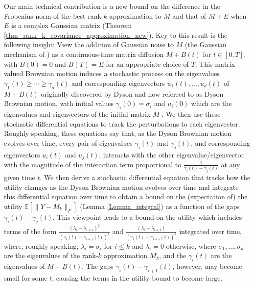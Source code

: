 \documentclass[11pt,letterpaper]{article}
\begin{document}
Our main technical contribution is a new bound on the difference in the Frobenius norm of the best rank-$k$ approximation to $M$  and that of $M+E$ when $E$ is a complex Gaussian matrix (Theorem \ref{thm_rank_k_covariance_approximation_new}). 
%
Key to this result is the following insight:  View the addition of Gaussian noise to $M$ (the Gaussian mechanism of \cite{dwork2014analyze}) as a continuous-time matrix diffusion $M + B(t)$ for $t \in [0,T]$, with $B(0)=0$ and $B(T)=E$ for an appropriate choice of $T$.
%
% 
This matrix-valued Brownian motion induces a stochastic process on the eigenvalues $\gamma_1(t) \geq \cdots \geq \gamma_d(t)$ and corresponding eigenvectors $u_1(t), \ldots, u_d(t)$ of $M+B(t)$ originally discovered by Dyson and now referred to as Dyson Brownian motion, with initial values $\gamma_i(0) = \sigma_i$ and $u_i(0)$ which are the eigenvalues and eigenvectors of the initial matrix $M$ \cite{dyson1962brownian}.
% 
We then use these stochastic differential equations to track the perturbations to each eigenvector.
%
Roughly speaking, these equations say that, as the Dyson Brownian motion evolves over time, every pair of eigenvalues $\gamma_i(t)$ and $\gamma_j(t)$, and corresponding eigenvectors $u_i(t)$ and $u_j(t)$, interacts with the other eigenvalue/eigenvector with the magnitude of the interaction term proportional to $ \frac{1}{\gamma_i(t) - \gamma_j(t)}$ at any given time $t$. 
%  
We then derive a stochastic differential equation that tracks how the utility changes as the Dyson Brownian motion evolves over time and integrate this differential equation over time to obtain a bound on the (expectation of) the utility $\mathbb{E}[\|Y -M_k \|_F]$ (Lemma \ref{Lemma_integral}) as a function of the gaps $\gamma_i(t) - \gamma_j(t)$.
%
This viewpoint leads to a bound on the utility which includes terms of the form $\frac{(\lambda_i - \lambda_{i+1})^2}{(\gamma_i(t) -\gamma_{i+1}(t))^{2}}$  and $\frac{(\lambda_i - \lambda_{i+1})}{(\gamma_i(t) -\gamma_{i+1}(t))^{2}}$ integrated over time, where, roughly speaking, $\lambda_i = \sigma_i$ for $i \leq k$ and $\lambda_i = 0$ otherwise, where  
% 
 $\sigma_1,\ldots, \sigma_k$ are the eigenvalues of the rank-$k$ approximation $M_k$, and the $\gamma_i(t)$ are the eigenvalues of  $M+B(t)$.
%
The gaps $\gamma_i(t)-\gamma_{i+1}(t)$, however, may become small for some $t$, causing the terms in the utility bound to become large.
%
\end{document}
